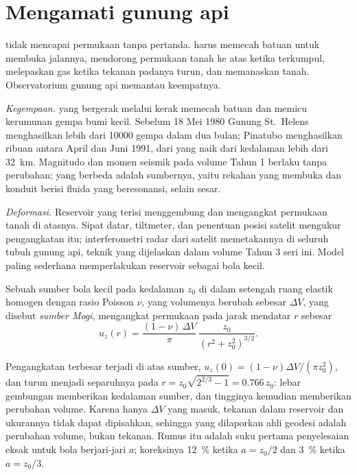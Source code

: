 \section{Mengamati gunung api}

 tidak mencapai permukaan tanpa pertanda.  harus memecah batuan untuk membuka
jalannya, mendorong permukaan tanah ke atas ketika terkumpul, melepaskan gas ketika tekanan
padanya turun, dan memanaskan tanah. Observatorium gunung api memantau keempatnya.

\emph{Kegempaan.}  yang bergerak melalui kerak memecah batuan dan memicu kerumunan
gempa bumi kecil. Sebelum 18 Mei 1980 Gunung St.~Helens menghasilkan lebih dari
\num{10000} gempa dalam dua bulan; Pinatubo menghasilkan ribuan antara April dan
Juni 1991, dari  yang naik dari kedalaman lebih dari \qty{32}{km}. Magnitudo
dan momen seismik pada volume Tahun 1 berlaku tanpa perubahan; yang berbeda adalah
sumbernya, yaitu rekahan yang membuka dan konduit berisi fluida yang beresonansi, selain sesar.

\emph{Deformasi.} Reservoir yang terisi menggembung dan mengangkat permukaan tanah di atasnya.
Sipat datar, tiltmeter, dan penentuan posisi satelit mengukur pengangkatan itu; interferometri radar dari satelit memetakannya di seluruh
tubuh gunung api, teknik yang dijelaskan dalam volume Tahun 3 seri ini. Model paling
sederhana memperlakukan reservoir sebagai bola kecil.

\begin{proposition}\label{prop:b2:eruptive-styles:mogi}
Sebuah sumber bola kecil pada kedalaman $z_0$ di dalam setengah ruang elastik homogen
dengan rasio Poisson $\nu$, yang volumenya berubah sebesar $\Delta V$, yang disebut
\emph{sumber Mogi}, mengangkat permukaan pada jarak mendatar $r$
sebesar
\[
u_z(r) = \frac{(1 - \nu)\,\Delta V}{\pi}\,\frac{z_0}{(r^2 + z_0^2)^{3/2}} .
\]
\end{proposition}
\admitted

Pengangkatan terbesar terjadi di atas sumber, $u_z(0) = (1 - \nu)\Delta V/(\pi z_0^2)$, dan
turun menjadi separuhnya pada $r = z_0\sqrt{2^{2/3} - 1} = 0.766\,z_0$: lebar
gembungan memberikan kedalaman sumber, dan tingginya kemudian memberikan perubahan
volume. Karena hanya $\Delta V$ yang masuk, tekanan dalam reservoir dan ukurannya
tidak dapat dipisahkan, sehingga yang dilaporkan ahli geodesi adalah perubahan volume, bukan tekanan.
Rumus itu adalah suku pertama penyelesaian eksak untuk bola berjari-jari
$a$; koreksinya \qty{12}{\percent} ketika $a = z_0/2$ dan \qty{3}{\percent}
ketika $a = z_0/3$.

